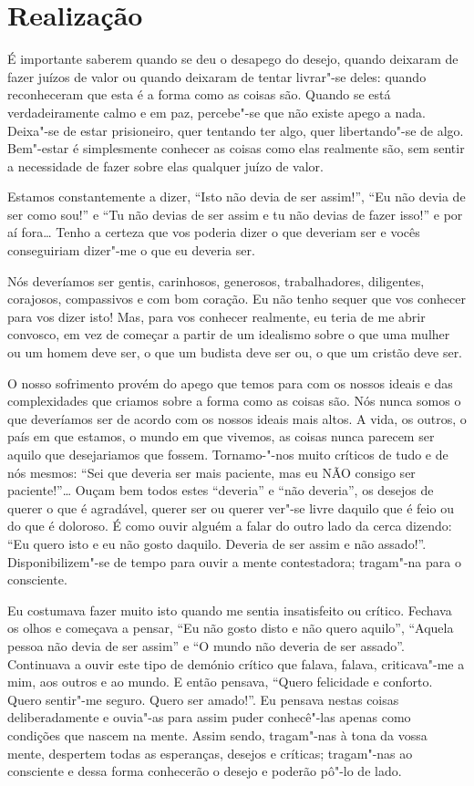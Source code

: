 \section{Realização}

É importante saberem quando se deu o desapego do desejo, quando deixaram de
fazer juízos de valor ou quando deixaram de tentar livrar"-se deles: quando
reconheceram que esta é a forma como as coisas são. Quando se está
verdadeiramente calmo e em paz, percebe"-se que não existe apego a nada. Deixa"-se
de estar prisioneiro, quer tentando ter algo, quer libertando"-se de algo.
Bem"-estar é simplesmente conhecer as coisas como elas realmente são, sem sentir
a necessidade de fazer sobre elas qualquer juízo de valor.

Estamos constantemente a dizer, “Isto não devia de ser assim!”, “Eu não devia de
ser como sou!” e “Tu não devias de ser assim e tu não devias de fazer isso!” e
por aí fora\ldots{} Tenho a certeza que vos poderia dizer o que deveriam ser e
vocês conseguiriam dizer"-me o que eu deveria ser.

Nós deveríamos ser gentis,
carinhosos, generosos, trabalhadores, diligentes, corajosos, compassivos e com
bom coração. Eu não tenho sequer que vos conhecer para vos dizer isto! Mas, para
vos conhecer realmente, eu teria de me abrir convosco, em vez de começar a
partir de um idealismo sobre o que uma mulher ou um homem deve ser, o que um
budista deve ser ou, o que um cristão deve ser.

O nosso sofrimento provém do apego que temos para com os nossos ideais e das
complexidades que criamos sobre a forma como as coisas são. Nós nunca somos o
que deveríamos ser de acordo com os nossos ideais mais altos. A vida, os outros,
o país em que estamos, o mundo em que vivemos, as coisas nunca parecem ser
aquilo que desejariamos que fossem. Tornamo-"-nos muito críticos de tudo e de nós
mesmos: “Sei que deveria ser mais paciente, mas eu NÃO consigo ser
paciente!”\ldots{} Ouçam bem todos estes “deveria” e “não deveria”, os desejos
de querer o que é agradável, querer ser ou querer ver"-se livre daquilo que é
feio ou do que é doloroso. É como ouvir alguém a falar do outro lado da cerca
dizendo: “Eu quero isto e eu não gosto daquilo. Deveria de ser assim e não
assado!”. Disponibilizem"-se de tempo para ouvir a mente contestadora; tragam"-na
para o consciente.

Eu costumava fazer muito isto quando me sentia insatisfeito ou crítico. Fechava
os olhos e começava a pensar, “Eu não gosto disto e não quero aquilo”, “Aquela
pessoa não devia de ser assim” e “O mundo não deveria de ser assado”. Continuava
a ouvir este tipo de demónio crítico que falava, falava, criticava"-me a mim, aos
outros e ao mundo. E então pensava, “Quero felicidade e conforto. Quero
sentir"-me seguro. Quero ser amado!”. Eu pensava nestas coisas deliberadamente e
ouvia"-as para assim puder conhecê"-las apenas como condições que nascem na mente.
Assim sendo, tragam"-nas à tona da vossa mente, despertem todas as esperanças,
desejos e críticas; tragam"-nas ao consciente e dessa forma conhecerão o desejo e
poderão pô"-lo de lado.

